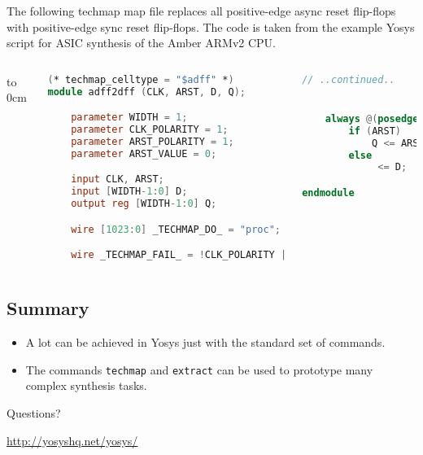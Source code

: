\begin{frame}[t, fragile]{\subsubsecname}
The following techmap map file replaces all positive-edge async reset flip-flops with
positive-edge sync reset flip-flops. The code is taken from the example Yosys script
for ASIC synthesis of the Amber ARMv2 CPU.

\begin{columns}
\column[t]{6cm}
\vbox to 0cm{
\begin{lstlisting}[basicstyle=\ttfamily\fontsize{8pt}{10pt}\selectfont, language=Verilog]
(* techmap_celltype = "$adff" *)
module adff2dff (CLK, ARST, D, Q);

    parameter WIDTH = 1;
    parameter CLK_POLARITY = 1;
    parameter ARST_POLARITY = 1;
    parameter ARST_VALUE = 0;

    input CLK, ARST;
    input [WIDTH-1:0] D;
    output reg [WIDTH-1:0] Q;

    wire [1023:0] _TECHMAP_DO_ = "proc";

    wire _TECHMAP_FAIL_ = !CLK_POLARITY || !ARST_POLARITY;
\end{lstlisting}
\vss}
\column[t]{4cm}
\begin{lstlisting}[basicstyle=\ttfamily\fontsize{8pt}{10pt}\selectfont, language=Verilog]
// ..continued..


    always @(posedge CLK)
        if (ARST)
            Q <= ARST_VALUE;
        else
             <= D;

endmodule
\end{lstlisting}
\end{columns}

\end{frame}


\subsection{Summary}

\begin{frame}{\subsecname}
\begin{itemize}
\item A lot can be achieved in Yosys just with the standard set of commands.
\item The commands {\tt techmap} and {\tt extract} can be used to prototype many complex synthesis tasks.
\end{itemize}

\bigskip
\bigskip
\begin{center}
Questions?
\end{center}

\bigskip
\bigskip
\begin{center}
\url{http://yosyshq.net/yosys/}
\end{center}
\end{frame}

